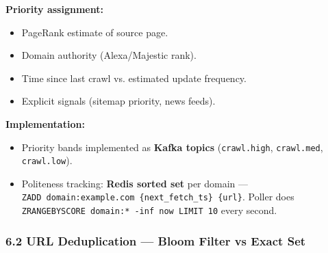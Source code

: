 \documentclass[11pt]{article}
\providecommand{\tightlist}{\setlength{\itemsep}{1pt}\setlength{\parskip}{0pt}}
\begin{document}
\textbf{Priority assignment:}

\begin{itemize}
\tightlist
\item
  PageRank estimate of source page.
\item
  Domain authority (Alexa/Majestic rank).
\item
  Time since last crawl vs. estimated update frequency.
\item
  Explicit signals (sitemap priority, news feeds).
\end{itemize}

\textbf{Implementation:}

\begin{itemize}
\tightlist
\item
  Priority bands implemented as \textbf{Kafka topics} (\texttt{crawl.high}, \texttt{crawl.med}, \texttt{crawl.low}).
\item
  Politeness tracking: \textbf{Redis sorted set} per domain --- \texttt{ZADD\ domain:example.com\ \{next\_fetch\_ts\}\ \{url\}}. Poller does \texttt{ZRANGEBYSCORE\ domain:*\ -inf\ now\ LIMIT\ 10} every second.
\end{itemize}

\subsubsection{6.2 URL Deduplication --- Bloom Filter vs Exact Set}\label{62-url-deduplication--bloom-filter-vs-exact-set}
\end{document}
